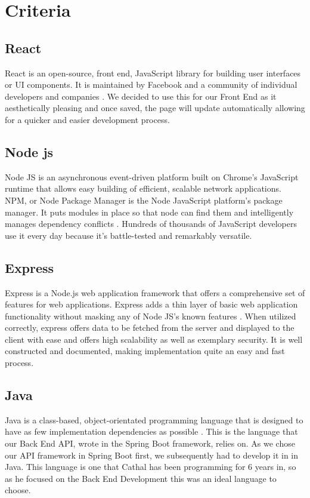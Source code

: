 \section{Criteria}
\subsection{React}
React is an open-source, front end, JavaScript library for building user interfaces or UI components. It is maintained by Facebook and a community of individual developers and companies \cite{React}. We decided to use this for our Front End as it aesthetically pleasing and once saved, the page will update automatically allowing for a quicker and easier development process.

\subsection{Node js}
\cite{NodsJS}Node JS is an asynchronous event-driven platform built on Chrome's JavaScript runtime that allows easy building of efficient, scalable network applications. NPM, or Node Package Manager is the Node JavaScript platform's package manager. It puts modules in place so that node can find them and intelligently manages dependency conflicts \cite{NodsJS}. Hundreds of thousands of JavaScript developers use it every day because it's battle-tested and remarkably versatile.

\subsection{Express}
\cite{ExpressJS}Express is a Node.js web application framework that offers a comprehensive set of features for web applications. Express adds a thin layer of basic web application functionality without masking any of Node JS's known features \cite{ExpressJS}. When utilized correctly, express offers data to be fetched from the server and displayed to the client with ease and offers high scalability as well as exemplary security. It is well constructed and documented, making implementation quite an easy and fast process.

\subsection{Java}
Java is a class-based, object-orientated programming language that is designed to have as few implementation dependencies as possible \cite{Java}. This is the language that our Back End API, wrote in the Spring Boot framework, relies on. As we chose our API framework in Spring Boot first, we subsequently had to develop it in in Java. This language is one that Cathal has been programming for 6 years in, so as he focused on the Back End Development this was an ideal language to choose.

